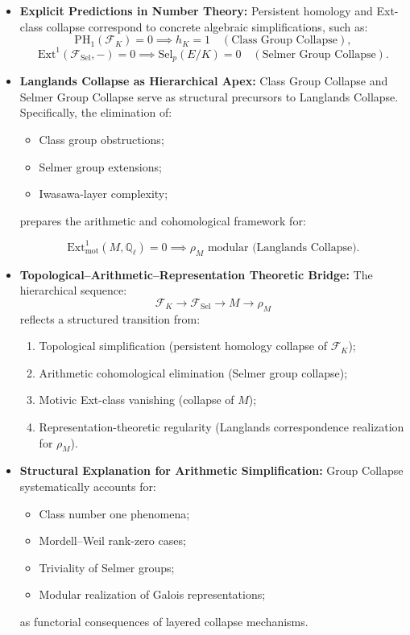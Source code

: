 \documentclass[11pt]{article}
\begin{document}
\begin{itemize}
    \item \textbf{Explicit Predictions in Number Theory:}  
    Persistent homology and Ext-class collapse correspond to concrete algebraic simplifications, such as:
    \[
    \mathrm{PH}_1(\mathcal{F}_K) = 0 \implies h_K = 1 \quad (\text{Class Group Collapse}),
    \]
    \[
    \mathrm{Ext}^1(\mathcal{F}_{\mathrm{Sel}}, -) = 0 \implies \mathrm{Sel}_p(E/K) = 0 \quad (\text{Selmer Group Collapse}).
    \]

    \item \textbf{Langlands Collapse as Hierarchical Apex:}  
    Class Group Collapse and Selmer Group Collapse serve as structural precursors to Langlands Collapse. Specifically, the elimination of:
    \begin{itemize}
        \item Class group obstructions;
        \item Selmer group extensions;
        \item Iwasawa-layer complexity;
    \end{itemize}
    prepares the arithmetic and cohomological framework for:

    \[
    \mathrm{Ext}^1_{\mathrm{mot}}(M, \mathbb{Q}_\ell) = 0 \implies \rho_M \text{ modular (Langlands Collapse)}.
    \]

    \item \textbf{Topological--Arithmetic--Representation Theoretic Bridge:}  
    The hierarchical sequence:
    \[
    \mathcal{F}_K \longrightarrow \mathcal{F}_{\mathrm{Sel}} \longrightarrow M \longrightarrow \rho_M
    \]
    reflects a structured transition from:

    \begin{enumerate}
        \item Topological simplification (persistent homology collapse of \( \mathcal{F}_K \));
        \item Arithmetic cohomological elimination (Selmer group collapse);
        \item Motivic Ext-class vanishing (collapse of \( M \));
        \item Representation-theoretic regularity (Langlands correspondence realization for \( \rho_M \)).
    \end{enumerate}

    \item \textbf{Structural Explanation for Arithmetic Simplification:}  
    Group Collapse systematically accounts for:
    \begin{itemize}
        \item Class number one phenomena;
        \item Mordell--Weil rank-zero cases;
        \item Triviality of Selmer groups;
        \item Modular realization of Galois representations;
    \end{itemize}
    as functorial consequences of layered collapse mechanisms.


\end{itemize}
\end{document}
